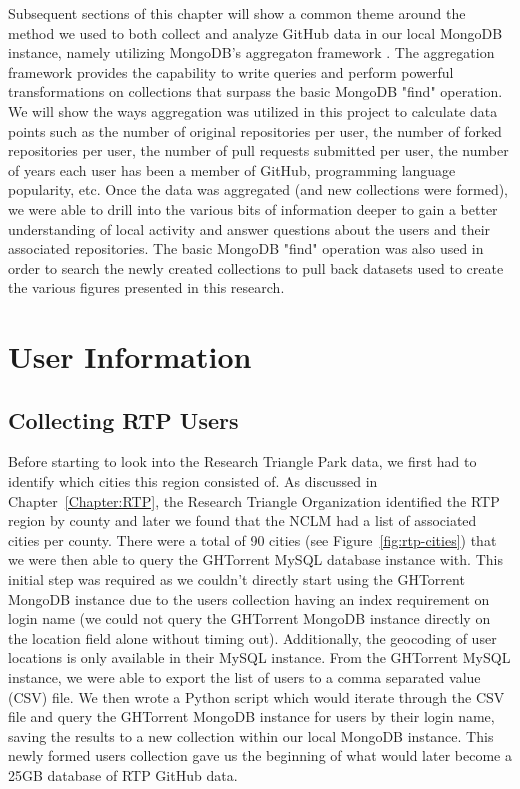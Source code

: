 Subsequent sections of this chapter will show a common theme around the method we used to both collect and analyze GitHub data in our local MongoDB instance, namely utilizing MongoDB's aggregaton framework \cite{_aggregation_????}. The aggregation framework provides the capability to write queries and perform powerful transformations on collections that surpass the basic MongoDB "find" operation. We will show the ways aggregation was utilized in this project to calculate data points such as the number of original repositories per user, the number of forked repositories per user, the number of pull requests submitted per user, the number of years each user has been a member of GitHub, programming language popularity, etc. Once the data was aggregated (and new collections were formed), we were able to drill into the various bits of information deeper to gain a better understanding of local activity and answer questions about the users and their associated repositories. The basic MongoDB "find" operation was also used in order to search the newly created collections to pull back datasets used to create the various figures presented in this research.

\section{User Information}
\subsection{Collecting RTP Users}
Before starting to look into the Research Triangle Park data, we first had to identify which cities this region consisted of. As discussed in Chapter~\ref{Chapter:RTP}, the Research Triangle Organization \cite{_research_????} identified the RTP region by county and later we found that the NCLM \cite{_north_????} had a list of associated cities per county. There were a total of 90 cities (see Figure~\ref{fig:rtp-cities}) that we were then able to query the GHTorrent MySQL database instance with. This initial step was required as we couldn't directly start using the GHTorrent MongoDB instance due to the users collection having an index requirement on login name (we could not query the GHTorrent MongoDB instance directly on the location field alone without timing out). Additionally, the geocoding of user locations is only available in their MySQL instance. From the GHTorrent MySQL instance, we were able to export the list of users to a comma separated value (CSV) file. We then wrote a Python script which would iterate through the CSV file and query the GHTorrent MongoDB instance for users by their login name, saving the results to a new collection within our local MongoDB instance. This newly formed users collection gave us the beginning of what would later become a 25GB database of RTP GitHub data.

